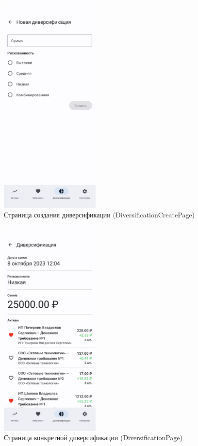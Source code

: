 \documentclass[a4paper, 14pt]{article}
\begin{document}
\begin{figure}[H]
    \centering
    \includegraphics[width=5cm]{resources/11.png}
    \caption{Страница создания диверсификации (DiversificationCreatePage)}
\end{figure}

\begin{figure}[H]
    \centering
    \includegraphics[width=5cm]{resources/12.png}
    \caption{Страница конкретной диверсификации (DiversificationPage)}
\end{figure}
\end{document}
